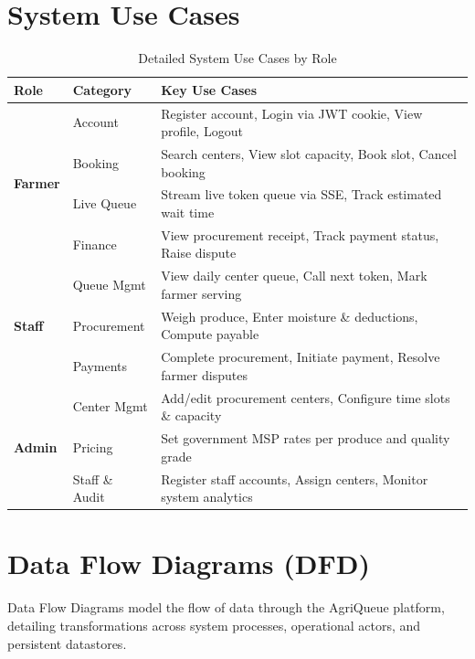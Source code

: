 \section{System Use Cases}

\begin{table}[H]
\centering
\caption{Detailed System Use Cases by Role}
\label{tab:usecases}
\renewcommand{\arraystretch}{1.2}
\begin{tabular}{|p{2.2cm}|p{3.5cm}|p{7.8cm}|}
\hline
\textbf{Role} & \textbf{Category} & \textbf{Key Use Cases} \\ \hline
\multirow{4}{*}{\textbf{Farmer}} 
  & Account & Register account, Login via JWT cookie, View profile, Logout \\ \cline{2-3}
  & Booking & Search centers, View slot capacity, Book slot, Cancel booking \\ \cline{2-3}
  & Live Queue & Stream live token queue via SSE, Track estimated wait time \\ \cline{2-3}
  & Finance & View procurement receipt, Track payment status, Raise dispute \\ \hline
\multirow{3}{*}{\textbf{Staff}} 
  & Queue Mgmt & View daily center queue, Call next token, Mark farmer serving \\ \cline{2-3}
  & Procurement & Weigh produce, Enter moisture \& deductions, Compute payable \\ \cline{2-3}
  & Payments & Complete procurement, Initiate payment, Resolve farmer disputes \\ \hline
\multirow{3}{*}{\textbf{Admin}} 
  & Center Mgmt & Add/edit procurement centers, Configure time slots \& capacity \\ \cline{2-3}
  & Pricing & Set government MSP rates per produce and quality grade \\ \cline{2-3}
  & Staff \& Audit & Register staff accounts, Assign centers, Monitor system analytics \\ \hline
\end{tabular}
\end{table}

\section{Data Flow Diagrams (DFD)}

Data Flow Diagrams model the flow of data through the AgriQueue platform, detailing transformations across system processes, operational actors, and persistent datastores.

